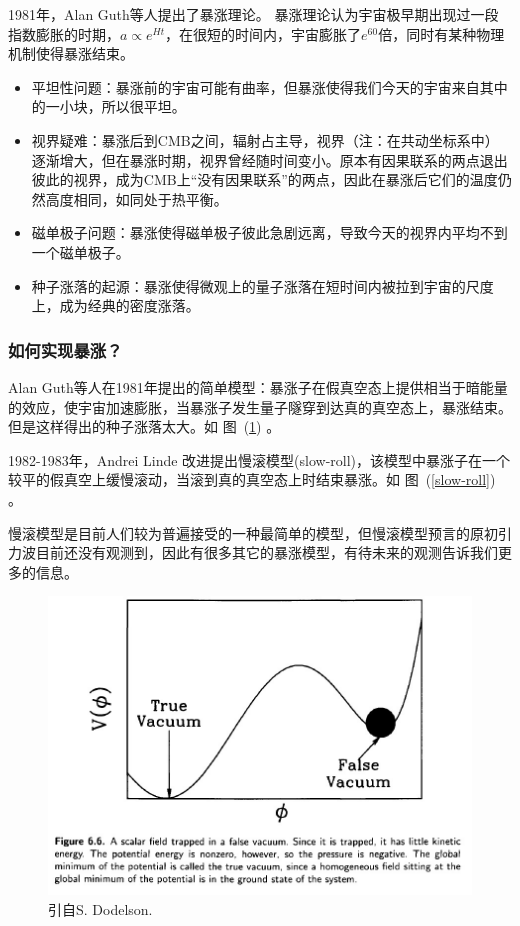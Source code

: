 \documentclass[]{ctexart}
\newcommand{\reffig}[1]{图~(\ref{#1})}
\begin{document}
1981年，Alan Guth等人提出了暴涨理论。
暴涨理论认为宇宙极早期出现过一段指数膨胀的时期，$a\propto e^{Ht}$，在很短的时间内，宇宙膨胀了$e^{60}$倍，同时有某种物理机制使得暴涨结束。

\begin{itemize}
    \item 平坦性问题：暴涨前的宇宙可能有曲率，但暴涨使得我们今天的宇宙来自其中的一小块，所以很平坦。
    \item 视界疑难：暴涨后到CMB之间，辐射占主导，视界（注：在共动坐标系中）逐渐增大，但在暴涨时期，视界曾经随时间变小。原本有因果联系的两点退出彼此的视界，成为CMB上“没有因果联系”的两点，因此在暴涨后它们的温度仍然高度相同，如同处于热平衡。
    \item 磁单极子问题：暴涨使得磁单极子彼此急剧远离，导致今天的视界内平均不到一个磁单极子。
    \item 种子涨落的起源：暴涨使得微观上的量子涨落在短时间内被拉到宇宙的尺度上，成为经典的密度涨落。
\end{itemize}

\subsubsection*{如何实现暴涨？}

Alan Guth等人在1981年提出的简单模型：暴涨子在假真空态上提供相当于暗能量的效应，使宇宙加速膨胀，当暴涨子发生量子隧穿到达真的真空态上，暴涨结束。但是这样得出的种子涨落太大。如 \reffig{suichuan} 。

1982-1983年，Andrei Linde 改进提出慢滚模型(slow-roll)，该模型中暴涨子在一个较平的假真空上缓慢滚动，当滚到真的真空态上时结束暴涨。如  \reffig{slow-roll} 。

慢滚模型是目前人们较为普遍接受的一种最简单的模型，但慢滚模型预言的原初引力波目前还没有观测到，因此有很多其它的暴涨模型，有待未来的观测告诉我们更多的信息。

\begin{figure}[!hbtp]
	\centering
	\includegraphics[width=1.0\linewidth]{suichuan.jpg}
	\caption{引自S. Dodelson.} \label{suichuan}
\end{figure}
\end{document}
